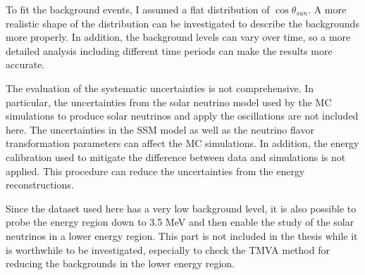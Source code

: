 To fit the background events, I assumed a flat distribution of $\cos\theta_{sun}$. A more realistic shape of the distribution can be investigated to describe the backgrounds more properly. In addition, the background levels can vary over time, so a more detailed analysis including different time periods can make the results more accurate.

The evaluation of the systematic uncertainties is not comprehensive. In particular, the uncertainties from the solar neutrino model used by the MC simulations to produce solar neutrinos and apply the oscillations are not included here. The uncertainties in the SSM model as well as the neutrino flavor transformation parameters can affect the MC simulations. In addition, the energy calibration used to mitigate the difference between data and simulations is not applied. This procedure can reduce the uncertainties from the energy reconstructions. 

Since the dataset used here has a very low background level, it is also possible to probe the energy region down to 3.5 MeV and then enable the study of the solar neutrinos in a lower energy region. This part is not included in the thesis while it is worthwhile to be investigated, especially to check the TMVA method for reducing the backgrounds in the lower energy region.
